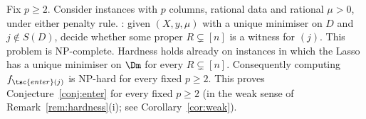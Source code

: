 \begin{theorem}\label{thm:enter2}
Fix $p\ge2$. Consider instances with $p$ columns, rational data and rational $\mu>0$, under either penalty rule. : given $(X,y,\mu)$ with a unique minimiser on $D$ and $j\notin S(D)$, decide whether some proper $R\subsetneq[n]$ is a witness for $(j)$. This problem is NP-complete. Hardness holds already on instances in which the Lasso has a unique minimiser on $\Dm$ for every $R\subsetneq[n]$. Consequently computing $f_{\tsc{enter}(j)}$ is NP-hard for every fixed $p\ge2$. This proves Conjecture~\ref{conj:enter} for every fixed $p\ge2$ (in the weak sense of Remark~\ref{rem:hardness}(i); see Corollary~\ref{cor:weak}).
\end{theorem}

